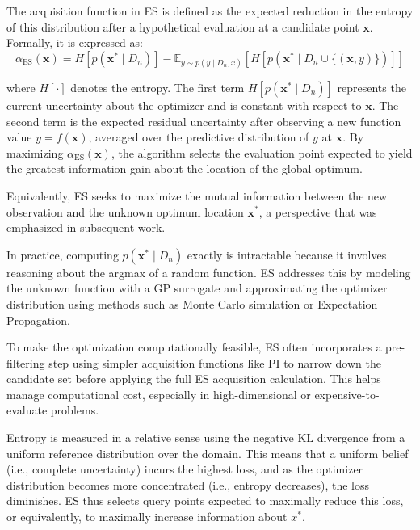 \documentclass{ut-thesis}
\begin{document}
The acquisition function in ES is defined as the expected reduction in the entropy of this distribution after a hypothetical evaluation at a candidate point \( \mathbf{x} \). Formally, it is expressed as:
\begin{equation}
    \alpha_{\text{ES}}(\mathbf{x}) = H[p(\mathbf{x}^* \mid D_n)] - \mathbb{E}_{y \sim p(y \mid D_n, x)} \left[ H[p(\mathbf{x}^* \mid D_n \cup \{(\mathbf{x}, y)\})] \right]
\end{equation}

where \( H[\cdot] \) denotes the entropy. The first term \( H[p(\mathbf{x}^* \mid D_n)] \) represents the current uncertainty about the optimizer and is constant with respect to \( \mathbf{x} \). The second term is the expected residual uncertainty after observing a new function value \( y = f(\mathbf{x}) \), averaged over the predictive distribution of \( y \) at \( \mathbf{x} \). By maximizing \( \alpha_{\text{ES}}(\textbf{x}) \), the algorithm selects the evaluation point expected to yield the greatest information gain about the location of the global optimum.

Equivalently, ES seeks to maximize the mutual information between the new observation and the unknown optimum location \( \mathbf{x}^* \), a perspective that was emphasized in subsequent work.

In practice, computing \( p(\mathbf{x}^* \mid D_n) \) exactly is intractable because it involves reasoning about the argmax of a random function. ES addresses this by modeling the unknown function with a GP surrogate and approximating the optimizer distribution using methods such as Monte Carlo simulation or Expectation Propagation.

To make the optimization computationally feasible, ES often incorporates a pre-filtering step using simpler acquisition functions like PI to narrow down the candidate set before applying the full ES acquisition calculation. This helps manage computational cost, especially in high-dimensional or expensive-to-evaluate problems.

Entropy is measured in a relative sense using the negative KL divergence from a uniform reference distribution over the domain. This means that a uniform belief (i.e., complete uncertainty) incurs the highest loss, and as the optimizer distribution becomes more concentrated (i.e., entropy decreases), the loss diminishes. ES thus selects query points expected to maximally reduce this loss, or equivalently, to maximally increase information about \( x^* \).
\end{document}
